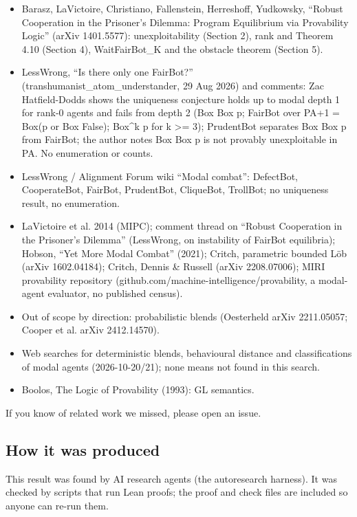 \documentclass{article}
\begin{document}
\begin{itemize}
\item Barasz, LaVictoire, Christiano, Fallenstein, Herreshoff, Yudkowsky, ``Robust Cooperation in the Prisoner's Dilemma: Program Equilibrium via Provability Logic'' (arXiv 1401.5577): unexploitability (Section 2), rank and Theorem 4.10 (Section 4), WaitFairBot\_K and the obstacle theorem (Section 5).
\item LessWrong, ``Is there only one FairBot?'' (transhumanist\_atom\_understander, 29 Aug 2026) and comments: Zac Hatfield-Dodds shows the uniqueness conjecture holds up to modal depth 1 for rank-0 agents and fails from depth 2 (Box Box p; FairBot over PA+1 = Box(p or Box False); Box\textasciicircum{}k p for k \textgreater{}= 3); PrudentBot separates Box Box p from FairBot; the author notes Box Box p is not provably unexploitable in PA. No enumeration or counts.
\item LessWrong / Alignment Forum wiki ``Modal combat'': DefectBot, CooperateBot, FairBot, PrudentBot, CliqueBot, TrollBot; no uniqueness result, no enumeration.
\item LaVictoire et al. 2014 (MIPC); comment thread on ``Robust Cooperation in the Prisoner's Dilemma'' (LessWrong, on instability of FairBot equilibria); Hobson, ``Yet More Modal Combat'' (2021); Critch, parametric bounded Löb (arXiv 1602.04184); Critch, Dennis \& Russell (arXiv 2208.07006); MIRI provability repository (github.com/machine-intelligence/provability, a modal-agent evaluator, no published census).
\item Out of scope by direction: probabilistic blends (Oesterheld arXiv 2211.05057; Cooper et al. arXiv 2412.14570).
\item Web searches for deterministic blends, behavioural distance and classifications of modal agents (2026-10-20/21); none means not found in this search.
\item Boolos, The Logic of Provability (1993): GL semantics.
\end{itemize}

If you know of related work we missed, please open an issue.

\subsection*{How it was produced}

This result was found by AI research agents (the autoresearch harness). It was checked by scripts that run Lean proofs; the proof and check files are included so anyone can re-run them.
\end{document}
